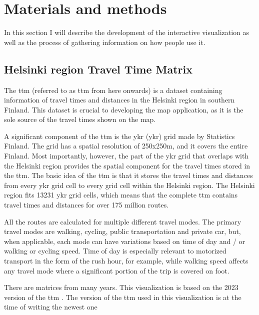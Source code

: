 \section{Materials and methods}
In this section I will describe the development of the interactive visualization
as well as the process of gathering information on how people use it.

\subsection{Helsinki region Travel Time Matrix}

The \acrlong{ttm} (referred to as \acrshort{ttm} from here onwards)
is a dataset containing information of travel times and distances
in the Helsinki region in southern Finland.
This dataset is crucial to developing the map application,
as it is the sole source of the travel times shown on the map.

A significant component of the \acrshort{ttm} is the \acrlong{ykr} (\acrshort{ykr}) grid
made by Statistics Finland.
The grid has a spatial resolution of 250x250m, and it covers the entire Finland.
Most importantly, however, the part of the \acrshort{ykr} grid that overlaps with
the Helsinki region provides the spatial component for
the travel times stored in the \acrshort{ttm}.
The basic idea of the \acrshort{ttm} is that it stores the travel times and distances
from every \acrshort{ykr} grid cell to every grid cell within the Helsinki region.
The Helsinki region fits 13231 \acrshort{ykr} grid cells,
which means that the complete \acrshort{ttm} contains travel times and distances for
over 175 million routes.

All the routes are calculated for multiple different travel modes.
The primary travel modes are walking, cycling, public transportation and private car,
but, when applicable, each mode can have variations based on
time of day and / or walking or cycling speed.
Time of day is especially relevant to motorized transport
in the form of the rush hour, for example,
while walking speed affects any travel mode
where a significant portion of the trip is covered on foot.


There are matrices from many years.
This visualization is based on the 2023 version of the \acrshort{ttm}
\parencite{fin2023}.
The version of the \acrshort{ttm} used in this visualization is at the time of writing the newest one

